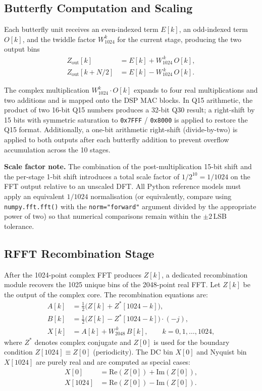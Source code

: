 \documentclass[12pt, a4paper]{article}
\begin{document}
\subsection{Butterfly Computation and Scaling}

Each butterfly unit receives an even-indexed term $E[k]$, an odd-indexed
term $O[k]$, and the twiddle factor $W_{1024}^k$ for the current stage,
producing the two output bins
\begin{align}
    Z_\text{out}[k]       &= E[k] + W_{1024}^{\,k}\,O[k], \label{eq:bf_top}\\
    Z_\text{out}[k + N/2] &= E[k] - W_{1024}^{\,k}\,O[k]. \label{eq:bf_bot}
\end{align}

The complex multiplication $W_{1024}^k \cdot O[k]$ expands to four real
multiplications and two additions and is mapped onto the DSP MAC blocks.
In Q15 arithmetic, the product of two 16-bit Q15 numbers produces a 32-bit
Q30 result; a right-shift by 15 bits with symmetric saturation to
\texttt{0x7FFF} / \texttt{0x8000} is applied to restore the Q15 format.
Additionally, a one-bit arithmetic right-shift (divide-by-two) is applied
to both outputs after each butterfly addition to prevent overflow
accumulation across the 10 stages.

\textbf{Scale factor note.}
The combination of the post-multiplication 15-bit shift and the per-stage
1-bit shift introduces a total scale factor of $1/2^{10} = 1/1024$ on the
FFT output relative to an unscaled DFT.
All Python reference models must apply an equivalent $1/1024$ normalisation
(or equivalently, compare using \texttt{numpy.fft.fft()} with the
\texttt{norm="forward"} argument divided by the appropriate power of two)
so that numerical comparisons remain within the $\pm 2$\,LSB tolerance.

\subsection{RFFT Recombination Stage}
\label{sec:recombine}

After the 1024-point complex FFT produces $Z[k]$, a dedicated recombination
module recovers the 1025 unique bins of the 2048-point real FFT.
Let $Z[k]$ be the output of the complex core.
The recombination equations are:
\begin{align}
    A[k] &= \tfrac{1}{2}\bigl(Z[k] + Z^{*}[1024-k]\bigr), \\
    B[k] &= \tfrac{1}{2}\bigl(Z[k] - Z^{*}[1024-k]\bigr)\cdot(-j), \\
    X[k] &= A[k] + W_{2048}^{\,k}\,B[k],
            \qquad k = 0, 1, \ldots, 1024,
\end{align}
where $Z^{*}$ denotes complex conjugate and $Z[0]$ is used for the boundary
condition $Z[1024] \equiv Z[0]$ (periodicity).
The DC bin $X[0]$ and Nyquist bin $X[1024]$ are purely real and are computed
as special cases:
\begin{align}
    X[0]    &= \mathrm{Re}(Z[0]) + \mathrm{Im}(Z[0]), \\
    X[1024] &= \mathrm{Re}(Z[0]) - \mathrm{Im}(Z[0]).
\end{align}
\end{document}
